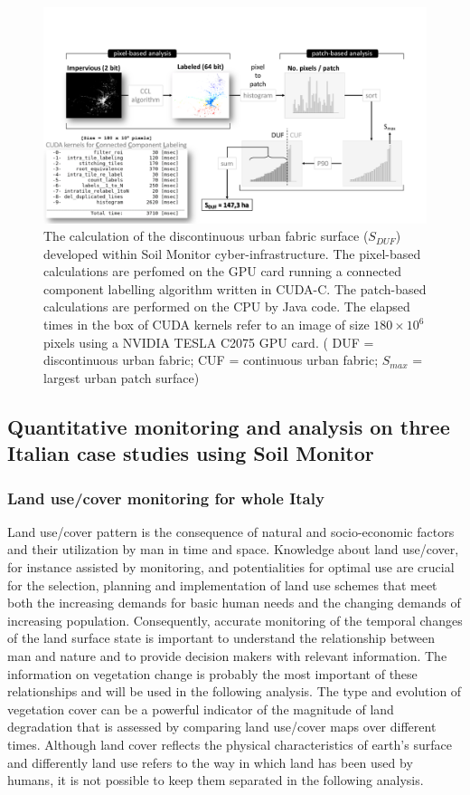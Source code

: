 \documentclass[APA,LATO1COL,doublespace]{WileyNJD-v2}
\begin{document}
\begin{figure}[t] %
    \centerline{\includegraphics[width=500pt]{03_DUF_explanation.pdf}}
    \caption{ The calculation of the discontinuous urban fabric surface ($S_{DUF}$) developed within Soil Monitor cyber-infrastructure. 
    The pixel-based calculations are perfomed on the GPU card running a connected component labelling algorithm written in CUDA-C. 
    The patch-based calculations are performed on the CPU by Java code.
    The elapsed times in the box of CUDA kernels refer to an image of size $180 \times 10^6$ pixels using a NVIDIA TESLA C2075 GPU card.
    ( DUF = discontinuous urban fabric; CUF = continuous urban fabric; $S_{max}$ = largest urban patch surface)} \label{fig:ccl}
\end{figure}


\subsection{Quantitative monitoring and analysis on three Italian case studies using Soil Monitor}\label{sec:caseStudies}

\subsubsection{ Land use/cover monitoring for whole Italy } \label{sec:caseIT}
Land use/cover pattern is the consequence of natural and socio-economic factors and their utilization by man in time and space.
Knowledge about land use/cover, for instance assisted by monitoring, and potentialities for optimal use are crucial for the selection, planning and implementation of land use schemes that meet both the increasing demands for basic human needs and %
the changing demands of increasing population.
Consequently, accurate monitoring of the temporal changes of the land surface state is important to understand the relationship between man and nature and to provide decision makers with relevant information.
The information on vegetation change is probably the most important of these relationships and will be used in the following analysis.
The type and evolution of vegetation cover can be a powerful indicator of the magnitude of land degradation that is assessed by comparing land use/cover maps over different times.
Although land cover reflects the physical characteristics of earth's surface and differently land use refers to the way in which land has been used by humans, it is not possible to keep them separated in the following analysis.
\end{document}
